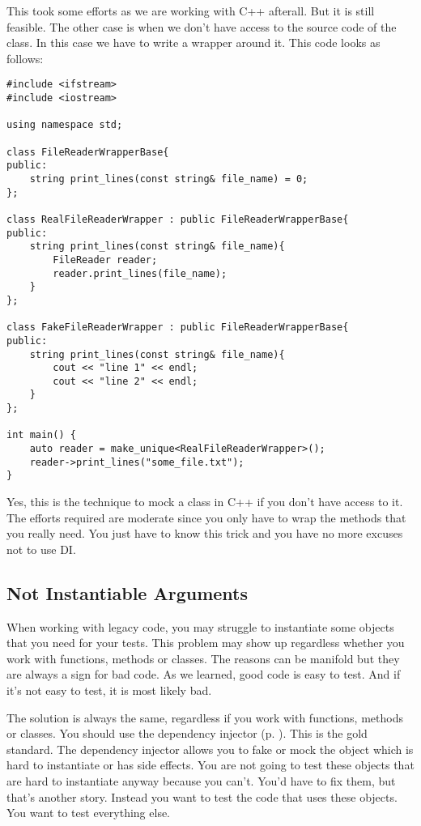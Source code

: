 This took some efforts as we are working with C++ afterall. But it is still feasible. The other case is when we don't have access to the source code of the  class. In this case we have to write a wrapper around it. This code looks as follows:

\begin{programcode}{}
\begin{verbatim}
#include <ifstream>
#include <iostream>

using namespace std;

class FileReaderWrapperBase{
public:
    string print_lines(const string& file_name) = 0;
};

class RealFileReaderWrapper : public FileReaderWrapperBase{
public:
    string print_lines(const string& file_name){
        FileReader reader;
        reader.print_lines(file_name);
    }
};

class FakeFileReaderWrapper : public FileReaderWrapperBase{
public:
    string print_lines(const string& file_name){
        cout << "line 1" << endl;
        cout << "line 2" << endl;
    }
};

int main() {
    auto reader = make_unique<RealFileReaderWrapper>();
    reader->print_lines("some_file.txt");
}
\end{verbatim}
\end{programcode}

Yes, this is the technique to mock a class in C++ if you don't have access to it. The efforts required are moderate since you only have to wrap the methods that you really need. You just have to know this trick and you have no more excuses not to use DI.

\subsection{Not Instantiable Arguments}

When working with legacy code, you may struggle to instantiate some objects that you need for your tests. This problem may show up regardless whether you work with functions, methods or classes. The reasons can be manifold but they are always a sign for bad code. As we learned, good code is easy to test. And if it's not easy to test, it is most likely bad. 

The solution is always the same, regardless if you work with functions, methods or classes. You should use the dependency injector (p. \pageref{sec:dependency_injector}). This is the gold standard. The dependency injector allows you to fake or mock the object which is hard to instantiate or has side effects. You are not going to test these objects that are hard to instantiate anyway because you can't. You'd have to fix them, but that's another story. Instead you want to test the code that uses these objects. You want to test everything else.

